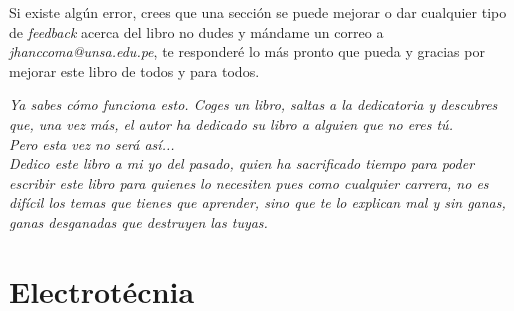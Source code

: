 \documentclass[
	12pt, %
	fleqn, %
	a4paper, %
]{LegrandOrangeBook}
\begin{document}
\noindent Si existe algún error, crees que una sección se puede mejorar o dar cualquier tipo de \textit{feedback} acerca del libro no dudes y mándame un correo a \textit{jhanccoma@unsa.edu.pe}, te responderé lo más pronto que pueda y gracias por mejorar este libro de todos y para todos.
\clearpage
\begin{center}
    \thispagestyle{empty}
    \vspace*{\fill}
    \textit{Ya sabes cómo funciona esto. Coges un libro, saltas a la dedicatoria y descubres que, una vez más, el autor ha dedicado su libro a alguien que no eres tú.\\
    Pero esta vez no será así...\\
    Dedico este libro a mi yo del pasado, quien ha sacrificado tiempo para poder escribir este libro para quienes lo necesiten pues como cualquier carrera, no es difícil los temas que tienes que aprender, sino que te lo explican mal y sin ganas, ganas  desganadas que destruyen las tuyas.}
    \vspace*{\fill}
\end{center}
\clearpage



\pagestyle{empty} %

\tableofcontents %

\cleardoublepage %

\pagestyle{fancy} %
\part{Electrotécnia}
\end{document}
